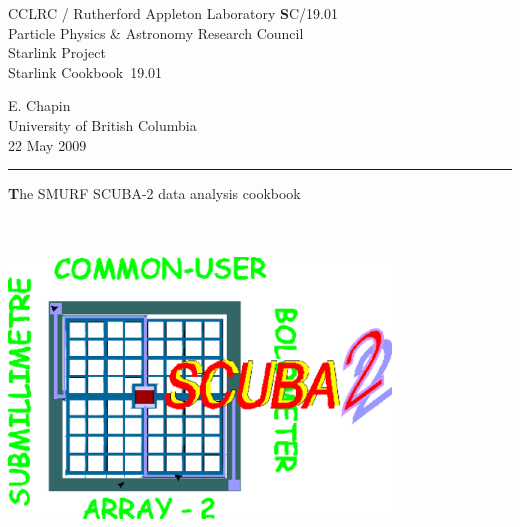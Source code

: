 \documentclass[twoside,11pt]{article}
\newcommand{\stardoccategory}  {Starlink Cookbook}
\newcommand{\stardocinitials}  {SC}
\newcommand{\stardocnumber}    {19.01}
\newcommand{\stardocauthors}   {E. Chapin \\ 
University of British Columbia}
\newcommand{\stardocdate}      {22 May 2009}
\newcommand{\stardoctitle}     {The SMURF SCUBA-2 data analysis cookbook}
\newcommand{\stardocversion}   {\ }
\newcommand{\stardocmanual}    {\ }
\newcommand{\stardocname}{\stardocinitials /\stardocnumber}
\newenvironment{latexonly}{}{}
\renewcommand{\_}{\texttt{\symbol{95}}}
\begin{document}
\thispagestyle{empty}

\begin{latexonly}
   CCLRC / {\textsc Rutherford Appleton Laboratory} \hfill {\textbf 
\stardocname}\\
   {\large Particle Physics \& Astronomy Research Council}\\
   {\large Starlink Project\\}
   {\large \stardoccategory\ \stardocnumber}
   \begin{flushright}
   \stardocauthors\\
   \stardocdate
   \end{flushright}
   \vspace{-4mm}
   \rule{\textwidth}{0.5mm}
   \vspace{5mm}
   \begin{center}
   {\Huge\textbf  \stardoctitle \\ [2.5ex]}
   {\LARGE\textbf \stardocversion \\ [4ex]}
   {\Huge\textbf  \stardocmanual}
   \end{center}

\begin{center}
\hspace{1.3in}\includegraphics[width=4.0in]{sc19_logo.eps}
\end{center}

\end{latexonly}
\end{document}
